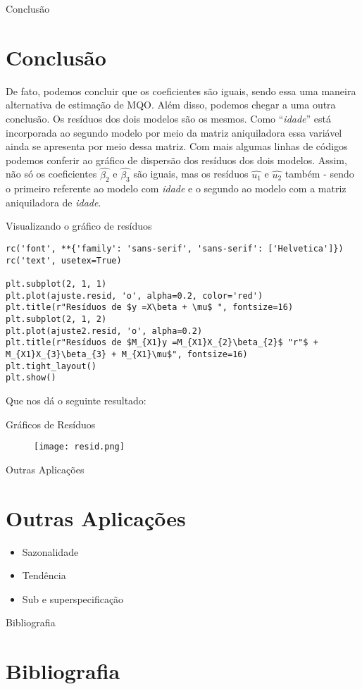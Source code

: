 \documentclass[11pt]{beamer}
\begin{document}
\begin{frame}[fragile]{Conclusão}
\section{Conclusão}
De fato, podemos concluir que os coeficientes são iguais, sendo essa uma maneira alternativa de estimação de MQO. Além disso, podemos chegar a uma outra conclusão. Os resíduos dos dois modelos são os mesmos. Como ``\textit{idade}'' está incorporada ao segundo modelo por meio da matriz aniquiladora essa variável ainda se apresenta por meio dessa matriz. Com mais algumas linhas de códigos podemos conferir ao gráfico de dispersão dos resíduos dos dois modelos. Assim, não só os coeficientes $\hat{\beta_{2}}$ e $\hat{\beta_{3}}$ são iguais, mas os resíduos $\hat{u_{1}}$ e $\hat{u_{2}}$ também - sendo o primeiro referente ao modelo com \textit{idade} e o segundo ao modelo com a matriz aniquiladora de \textit{idade}.
\end{frame}

\begin{frame}[fragile]{Visualizando o gráfico de resíduos}
\begin{lstlisting}
rc('font', **{'family': 'sans-serif', 'sans-serif': ['Helvetica']})
rc('text', usetex=True)

plt.subplot(2, 1, 1)
plt.plot(ajuste.resid, 'o', alpha=0.2, color='red')
plt.title(r"Resíduos de $y =X\beta + \mu$ ", fontsize=16)
plt.subplot(2, 1, 2)
plt.plot(ajuste2.resid, 'o', alpha=0.2)
plt.title(r"Resíduos de $M_{X1}y =M_{X1}X_{2}\beta_{2}$ "r"$ + M_{X1}X_{3}\beta_{3} + M_{X1}\mu$", fontsize=16)
plt.tight_layout()
plt.show()

\end{lstlisting}
Que nos dá o seguinte resultado:
\end{frame}

\begin{frame}{Gráficos de Resíduos}

\begin{figure}
	\texttt{[image: resid.png]}
\end{figure}

\end{frame}

\begin{frame}{Outras Aplicações}
\section{Outras Aplicações}

\begin{itemize}
	\item Sazonalidade
	\item Tendência
	\item Sub e superspecificação
\end{itemize}

\end{frame}

\begin{frame}{Bibliografia}
\section{Bibliografia}
\nocite{*}


\end{frame}
\end{document}
